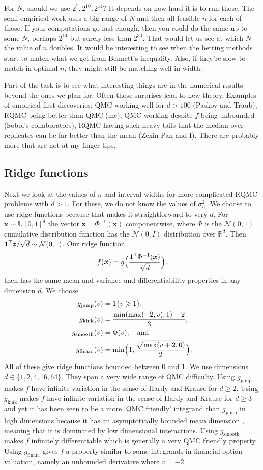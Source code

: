 \documentclass{article}
\newcommand{\art}[1]{\begingroup\color{blue}#1\endgroup}
\newcommand{\aadit}[1]{\begingroup\color{orange}#1\endgroup}
\renewcommand{\ge}{\geqslant}
\newcommand{\real}{\mathbb{R}}
\newcommand{\tran}{\mathsf{\scriptsize T}}
\newcommand{\bsx}{\boldsymbol{x}}
\newcommand{\bsz}{\boldsymbol{z}}
\newcommand{\bsone}{\boldsymbol{1}}
\newcommand{\dunif}{\mathbb{U}}
\newcommand{\dnorm}{\mathcal{N}}
\newcommand{\jmp}{\mathrm{jump}}
\newcommand{\knk}{\mathrm{kink}}
\newcommand{\smo}{\mathrm{smooth}}
\newcommand{\fin}{\mathrm{finan.}}
\begin{document}
\aadit{For $N$, should we use $2^7,2^{10},2^{14}?$}
\art{It depends on how hard it is to run those.  The semi-empirical
work uses a big range of $N$ and then all feasible $n$ for each
of those.  If your computations go fast enough, then you could
do the same up to some $N$, perhaps $2^{14}$ but surely
less than $2^{30}$.  That would let us see at which $N$
the value of $n$ doubles.  It would be interesting to see
when the betting methods start to match what we get from
Bennett's inequality.  Also, if they're slow to match in
optimal $n$, they might still be matching well in width.

Part of the task is to see what interesting things are in
the numerical results beyond the ones we plan for. Often
those surprises lead to new theory. Examples of empirical-first
discoveries: QMC working well for $d>100$ (Paskov and Traub), 
RQMC being better than QMC (me), 
QMC working despite $f$ being unbounded (Sobol's collaborators),
RQMC having such heavy tails that the median over replicates can be
far better than the mean (Zexin Pan and I). There are probably
more that are not at my finger tips.}

\subsection{Ridge functions}

Next we look at the values of $n$ and interval widths
for more complicated RQMC problems with $d>1$. For these,
we do not know the values of $\sigma^2_n$.
We choose to use ridge functions because that makes it
straightforward to very $d$.
For $\bsx\sim\dunif[0,1]^d$ the vector
$\bsz=\Phi^{-1}(\bsx)$ componentwise,
where $\Phi$ is the $\dnorm(0,1)$ cumulative distribution
function has the $\dnorm(0,I)$ distribution over $\real^d$.
Then $\bsone^\tran\bsz/\sqrt{d}\sim\dnorm(0,1)$.
Our ridge function
$$
f(\bsx) =g\Bigl( \frac{\bsone^\tran\Phi^{-1}(\bsx)}{\sqrt{d}}\Bigr).
$$
then has the same mean and variance and differentiability properties
in any dimension $d$.  We choose
\begin{align*}
g_\jmp(v) &= 1\{v\ge1\},\\
g_\knk(v) & = \frac{\min(\max(-2,v),1)+2}3,\\
g_\smo(v) & = \Phi(v),\quad\text{and}\\
g_\fin(v) & = \min\Bigl(1,\frac{\sqrt{\max(v+2,0)}}2\Bigr).
\end{align*}
All of these give ridge functions bounded between $0$ and $1$.
We use dimensions $d\in\{1,2,4,16,64\}$.
They span a very wide range of QMC difficulty.
Using $g_\jmp$ makes $f$ have infinite variation in
the sense of Hardy and Krause for $d\ge2$. 
Using $g_\knk$ makes $f$ have infinite variation in
the sense of Hardy and Krause for $d\ge3$ and yet
it has been seen to be a more `QMC friendly' integrand
than $g_\jmp$ in high dimensions because it has an
asymptotically bounded mean dimension \cite{mdridge},
meaning that it is dominated by low dimensional 
interactions.  Using $g_\smo$ makes $f$ infinitely
differentiable which is generally a very QMC friendly
property.  Using $g_\fin$ gives $f$ a property
similar to some integrands in financial option valuation, namely an
unbounded derivative where $v=-2$.
\end{document}
